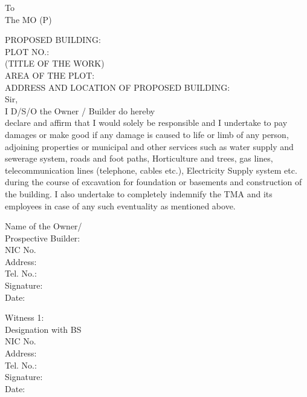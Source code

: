 \documentclass{article}
\begin{document}
To \\
The MO (P)

PROPOSED BUILDING: \hrulefill \\
PLOT NO.: \hrulefill \\
(TITLE OF THE WORK) \\
AREA OF THE PLOT: \hrulefill \\
ADDRESS AND LOCATION OF PROPOSED BUILDING: \hrulefill \\

Sir, \\
I \hspace{2cm} D/S/O \hspace{2cm} the Owner / Builder do hereby \\
declare and affirm that I would solely be responsible and I undertake to pay damages or make good if any
damage is caused to life or limb of any person, adjoining properties or municipal and other services such
as water supply and sewerage system, roads and foot paths, Horticulture and trees, gas lines,
telecommunication lines (telephone, cables etc.), Electricity Supply system etc. during the course of
excavation for foundation or basements and construction of the building. I also undertake to completely
indemnify the TMA and its employees in case of any such eventuality as mentioned above.

\vspace{0.5cm}

Name of the Owner/ \\
Prospective Builder: \hrulefill \\
NIC No. \hrulefill \\
Address: \hrulefill \\
Tel. No.: \hrulefill \\
Signature: \hrulefill \\
Date: \hrulefill \\

\vspace{0.5cm}

Witness 1: \\
Designation with BS \hrulefill \\
NIC No. \hrulefill \\
Address: \hrulefill \\
Tel. No.: \hrulefill \\
Signature: \hrulefill \\
Date: \hrulefill \\

\vspace{0.5cm}
\end{document}
